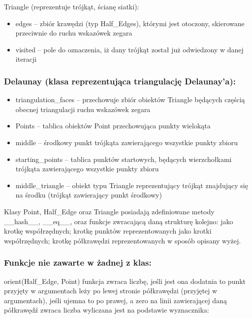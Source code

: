 \documentclass[12pt]{article}
\begin{document}
\mbox{}\newline
Triangle (reprezentuje trójkąt, ścianę siatki):
\begin{itemize}[noitemsep]
	\item edges – zbiór krawędzi (typ Half\_Edges), którymi jest otoczony, skierowane przeciwnie do ruchu wskazówek zegara
	\item visited – pole do oznaczenia, iż dany trójkąt został już odwiedzony w danej iteracji
\end{itemize}

\subsubsection*{Delaunay (klasa reprezentująca triangulację Delaunay’a):}
\begin{itemize}[noitemsep]
	\item triangulation\_faces – przechowuje zbiór obiektów Triangle będących częścią obecnej triangulacji ruchu wskazówek zegara
	\item Points – tablica obiektów Point przechowująca punkty wielokąta
	\item middle – środkowy punkt trójkąta zawierającego wszystkie punkty zbioru
	\item starting\_points – tablica punktów startowych, będących wierzchołkami trójkąta zawierającego wszystkie punkty zbioru
	\item middle\_triangle – obiekt typu Triangle reprezentujący trójkąt znajdujący się na środku (trójkąt zawierający punkt środkowy)
\end{itemize}

\newpage

Klasy Point, Half\_Edge oraz Triangle posiadają zdefiniowane metody \_\_hash\_\_, \_\_eq\_\_, oraz funkcje zwracającą daną strukturę kolejno: jako krotkę współrzędnych; krotkę punktów reprezentowanych jako krotki współrzędnych; krotkę półkrawędzi reprezentowanych w sposób opisany wyżej.

\subsubsection*{Funkcje nie zawarte w żadnej z klas:}
orient(Half\_Edge, Point) funkcja zwraca liczbę, jeśli jest ona dodatnia to punkt przyjęty w argumentach leży po lewej stronie półkrawędzi (przyjętej w argumentach), jeśli ujemna to po prawej, a zero na linii zawierającej daną półkrawędź zwraca liczba wyliczana jest na podstawie wyznacznika:
\end{document}
